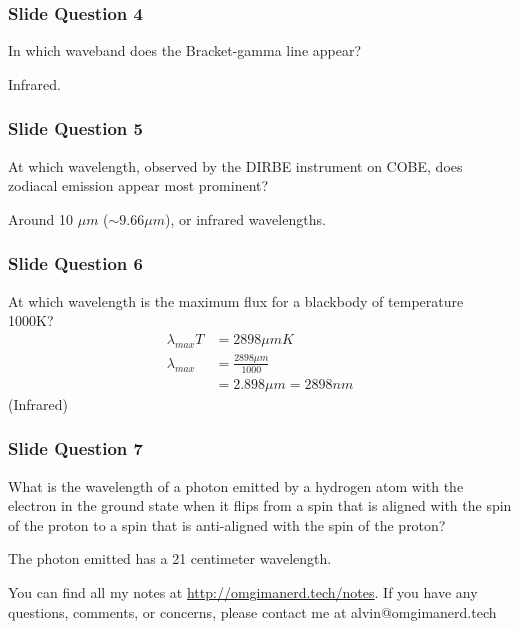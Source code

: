 \documentclass{math}
\begin{document}
\subsubsection*{Slide Question 4}
In which waveband does the Bracket-gamma line appear? \par
Infrared.

\subsubsection*{Slide Question 5}
At which wavelength, observed by the DIRBE instrument on COBE, does zodiacal
emission appear most prominent? \par
Around 10 \(\mu m \) (\( \sim9.66\mu m \)), or infrared wavelengths.

\subsubsection*{Slide Question 6}
At which wavelength is the maximum flux for a blackbody of temperature 1000K?
\begin{align*}
  \lambda_{max}T &= 2898\mu m K \\
  \lambda_{max} &= \frac{2898\mu m}{1000} \\
  &= 2.898\mu m = 2898nm
\end{align*}
(Infrared)

\subsubsection*{Slide Question 7}
What is the wavelength of a photon emitted by a hydrogen atom with the electron
in the ground state when it flips from a spin that is aligned with the spin of
the proton to a spin that is anti-aligned with the spin of the proton? \par
The photon emitted has a 21 centimeter wavelength.

\begin{center}
  You can find all my notes at \url{http://omgimanerd.tech/notes}. If you have
  any questions, comments, or concerns, please contact me at
  alvin@omgimanerd.tech
\end{center}
\end{document}
